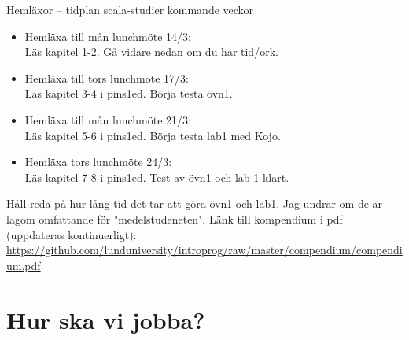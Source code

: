 \documentclass{slides}
\begin{document}
\begin{Slide}{Hemläxor -- tidplan scala-studier kommande veckor}
\begin{itemize}
\item Hemläxa till mån lunchmöte 14/3: \\ Läs kapitel 1-2. Gå vidare nedan om du har tid/ork.

\item Hemläxa till tors lunchmöte 17/3: \\ Läs kapitel 3-4 i pins1ed. Börja testa övn1.
\item Hemläxa till mån lunchmöte 21/3: \\
Läs kapitel 5-6 i pins1ed. Börja testa lab1 med Kojo.  

\item Hemläxa tors lunchmöte 24/3: \\
Läs kapitel 7-8 i pins1ed. Test av övn1 och lab 1 klart. 
\end{itemize}
 Håll reda på hur lång tid det tar att göra övn1 och lab1. Jag undrar om de är lagom  omfattande för "medelstudeneten".
Länk till kompendium i pdf (uppdateras kontinuerligt):
\url{https://github.com/lunduniversity/introprog/raw/master/compendium/compendium.pdf }
\end{Slide}

\section{Hur ska vi jobba?}
\end{document}
